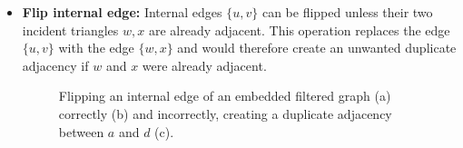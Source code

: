 \begin{itemize}
	\clearpage
	\item \textbf{Flip internal edge:} Internal edges $\{u, v\}$ can be flipped unless their two incident triangles  $w, x$ are already adjacent. This operation replaces the edge $\{u, v\}$ with the edge $\{w, x\}$ and would therefore create an unwanted duplicate adjacency if $w$ and $x$ were already adjacent.
\begin{figure}[H]
	\centering
	\quad
	\quad
	\caption{Flipping an internal edge of an embedded filtered graph (a) correctly (b) and incorrectly, creating a duplicate adjacency between $a$ and $d$ (c).}
	\label{fig:transformation}
\end{figure}


\end{itemize}
